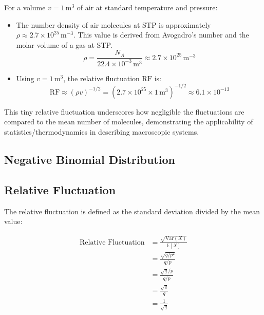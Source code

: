 \begin{example}
    For a volume \( v = 1 \, \text{m}^3 \) of air at standard temperature and pressure:
    \begin{itemize}
        \item The number density of air molecules at STP is approximately \( \rho \approx 2.7 \times 10^{25} \, \text{m}^{-3} \). This value is derived from Avogadro's number and the molar volume of a gas at STP.
              \[
                  \rho = \frac{N_A}{22.4 \times 10^{-3} \, \text{m}^3} \approx 2.7 \times 10^{25} \, \text{m}^{-3}
              \]
        \item Using \( v = 1 \, \text{m}^3 \), the relative fluctuation \( \text{RF} \) is:
              \[
                  \text{RF} \approx \left( \rho v \right)^{-1/2} = \left( 2.7 \times 10^{25} \times 1 \, \text{m}^3 \right)^{-1/2} \approx 6.1 \times 10^{-13}
              \]
    \end{itemize}

    This tiny relative fluctuation underscores how negligible the fluctuations are compared to the mean number of molecules, demonstrating the applicability of statistics/thermodynamics in describing macroscopic systems.

\end{example}

\subsection{Negative Binomial Distribution}








\subsection*{Relative Fluctuation}

The relative fluctuation is defined as the standard deviation divided by the mean value:

\begin{align*}
    \text{Relative Fluctuation} & = \frac{\sqrt{\text{Var}(X)}}{\mathbb{E}[X]} \\
                                & = \frac{\sqrt{q/p^2}}{q/p}                   \\
                                & = \frac{\sqrt{q}/p}{q/p}                     \\
                                & = \frac{\sqrt{q}}{q}                         \\
                                & = \frac{1}{\sqrt{q}}
\end{align*}

